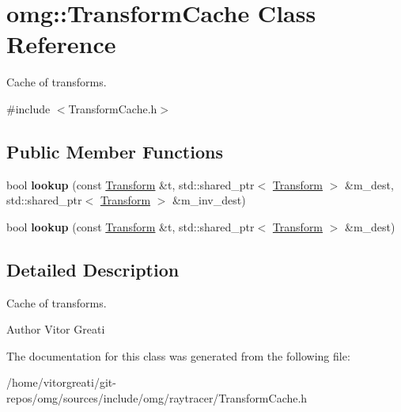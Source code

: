 \hypertarget{classomg_1_1_transform_cache}{}\section{omg\+::Transform\+Cache Class Reference}
\label{classomg_1_1_transform_cache}


Cache of transforms.  




{\ttfamily \#include $<$Transform\+Cache.\+h$>$}

\subsection*{Public Member Functions}
\begin{DoxyCompactItemize}
\item 
\mbox{\label{classomg_1_1_transform_cache_a259cf6699431f2be35844a4e359d6d1d}} 
bool {\bfseries lookup} (const \mbox{\hyperlink{classomg_1_1_transform}{Transform}} \&t, std\+::shared\+\_\+ptr$<$ \mbox{\hyperlink{classomg_1_1_transform}{Transform}} $>$ \&m\+\_\+dest, std\+::shared\+\_\+ptr$<$ \mbox{\hyperlink{classomg_1_1_transform}{Transform}} $>$ \&m\+\_\+inv\+\_\+dest)
\item 
\mbox{\label{classomg_1_1_transform_cache_a2dd3f1e1cc9cb1e42b22f40747e9ed6d}} 
bool {\bfseries lookup} (const \mbox{\hyperlink{classomg_1_1_transform}{Transform}} \&t, std\+::shared\+\_\+ptr$<$ \mbox{\hyperlink{classomg_1_1_transform}{Transform}} $>$ \&m\+\_\+dest)
\end{DoxyCompactItemize}


\subsection{Detailed Description}
Cache of transforms. 

\begin{DoxyAuthor}{Author}
Vitor Greati 
\end{DoxyAuthor}


The documentation for this class was generated from the following file\+:\begin{DoxyCompactItemize}
\item 
/home/vitorgreati/git-\/repos/omg/sources/include/omg/raytracer/Transform\+Cache.\+h\end{DoxyCompactItemize}
